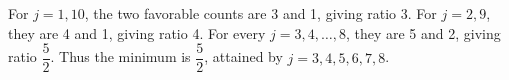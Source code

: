 For $j=1,10$, the two favorable counts are 3 and 1, giving ratio 3. For $j=2,9$, they are 4 and 1, giving ratio 4. For every $j=3,4,\ldots,8$, they are 5 and 2, giving ratio $\dfrac{5}{2}$. Thus the minimum is $\boxed{\dfrac{5}{2}}$, attained by $\boxed{j=3,4,5,6,7,8}$.
